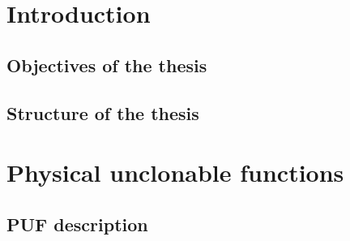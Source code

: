 \chapter{Introduction}

\section{Objectives of the thesis}




\section{Structure of the thesis}

\chapter{Physical unclonable functions}

\section{PUF description}

